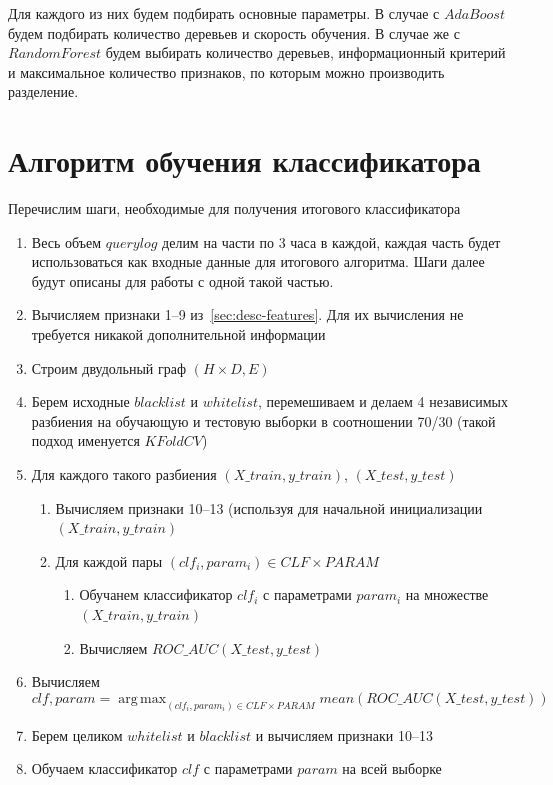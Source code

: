 \documentclass[14pt]{extreport}
\DeclareMathOperator*{\argmaxA}{arg\,max}
\begin{document}
	Для каждого из них будем подбирать основные параметры. В случае с $AdaBoost$ будем подбирать количество деревьев и скорость обучения. В случае же с $RandomForest$ будем выбирать количество деревьев, информационный критерий и максимальное количество признаков, по которым можно производить разделение.
	 
	 
	\section{Алгоритм обучения классификатора}
	Перечислим шаги, необходимые для получения итогового классификатора
	\begin{enumerate}
	\item Весь объем $querylog$ делим на части по 3 часа в каждой, каждая часть будет использоваться как входные данные для итогового алгоритма. Шаги далее будут описаны для работы с одной такой частью.
	
	\item Вычисляем признаки 1--9 из~\ref{sec:desc-features}. Для их вычисления не требуется никакой дополнительной информации
	
	\item Строим двудольный граф $(H \times D, E)$
	
	\item Берем исходные $blacklist$ и $whitelist$, перемешиваем и делаем 4 независимых разбиения на обучающую и тестовую выборки в соотношении 70/30 
	(такой подход именуется $KFold CV$)
	
	\item Для каждого такого разбиения $(X\_train, y\_train)$, $(X\_test, y\_test)$
	\begin{enumerate}
		\item Вычисляем признаки 10--13 (используя для начальной инициализации $(X\_train, y\_train)$
		\item Для каждой пары $(clf_i, param_i) \in CLF\times PARAM$
		\begin{enumerate}
			\item Обучанем классификатор $clf_i$ с параметрами $param_i$ на множестве $(X\_train, y\_train)$
			\item Вычисляем $ROC\_AUC(X\_test, y\_test)$
		\end{enumerate}
	
	\end{enumerate}
	
	\item Вычисляем
	\begin{equation}
	\label{eq:clf-opt}
	clf, param = \argmaxA_{(clf_i, param_i) \in CLF\times PARAM}mean(ROC\_AUC(X\_test, y\_test))
	\end{equation}
	\item Берем целиком $whitelist$ и $blacklist$ и вычисляем признаки 10--13
	\item Обучаем классификатор $clf$ с параметрами $param$ на всей выборке
	\end{enumerate}
	
\end{document}
